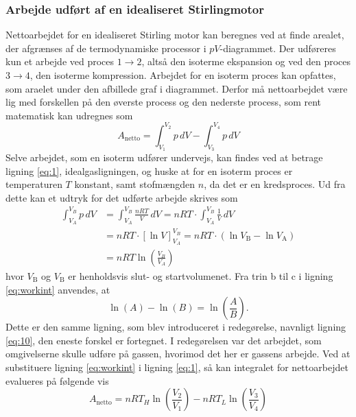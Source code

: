 \documentclass[SRC.tex]{subfiles}
\begin{document}
	\subsubsection{Arbejde udført af en idealiseret Stirlingmotor}
	Nettoarbejdet for en idealiseret Stirling motor kan beregnes ved at finde arealet, der afgrænses
	af de termodynamiske processor  i \(pV\)-diagrammet. Der udføreres kun et arbejde ved 
	proces \(1\rightarrow2\), altså den isoterme ekspansion og ved den proces \(3 \rightarrow 4\), 
	den isoterme kompression. Arbejdet for en isoterm proces kan opfattes, som araelet under den 
	afbillede graf i diagrammet. Derfor må nettoarbejdet være lig med forskellen på den øverste
	process og den nederste process, som rent matematisk kan udregnes som
	\begin{equation}
		A_{\text{netto}} = \int_{V_1}^{V_2} p \, dV - \int_{V_3}^{V_4} p \, dV 
		\label{eq:1}
	\end{equation}
	Selve arbejdet, som en isoterm udfører undervejs, kan findes ved at betrage ligning \eqref{eq:1},
	idealgasligningen, og huske at for en isoterm proces er temperaturen \(T\) konstant, samt stofmængden \(n\), da det er en kredsproces. Ud fra dette kan et udtryk for det udførte arbejde skrives som
	\begin{subequations}
		\begin{align}
		\int_{V_A}^{V_B} p \, dV &= \int_{V_A}^{V_B} \frac{nRT}{V} \, dV  = nRT \cdot 	\int_{V_A}^{V_B} \frac{1}{V}\, dV \\
		&= nRT \cdot \left[\ln V\right]_{V_A}^{V_B}  = nRT \cdot (\ln V_\text{B} - \ln V_\text{A})\\
		&=nRT \ln\left(\frac{V_B}{V_A}\right)
		\label{eq:workint}
		\end{align}
	\end{subequations}
	hvor \(V_{\text{B}}\) og \(V_{\text{B}}\) er henholdsvis slut- og startvolumenet. Fra trin b til c
	i ligning \eqref{eq:workint} anvendes, at \[\ln(A)-\ln(B) = \ln\left(\frac{A}{B}\right). \]
	Dette er den samme ligning, som blev introduceret i redegørelse, navnligt ligning \eqref{eq:10},
	den eneste forskel er fortegnet. I redegørelsen var det arbejdet, som omgivelserne skulle udføre
	på gassen, hvorimod det her er gassens arbejde. 
	Ved at substituere ligning \eqref{eq:workint} i ligning \eqref{eq:1}, så kan integralet for 
	nettoarbejdet evalueres på følgende vis
	\begin{equation}
		A_{\text{netto}} = nRT_H\ln\left(\frac{V_2}{V_1}\right)-nRT_L\ln\left(\frac{V_3}{V_4}\right)
	\end{equation}
\end{document}
